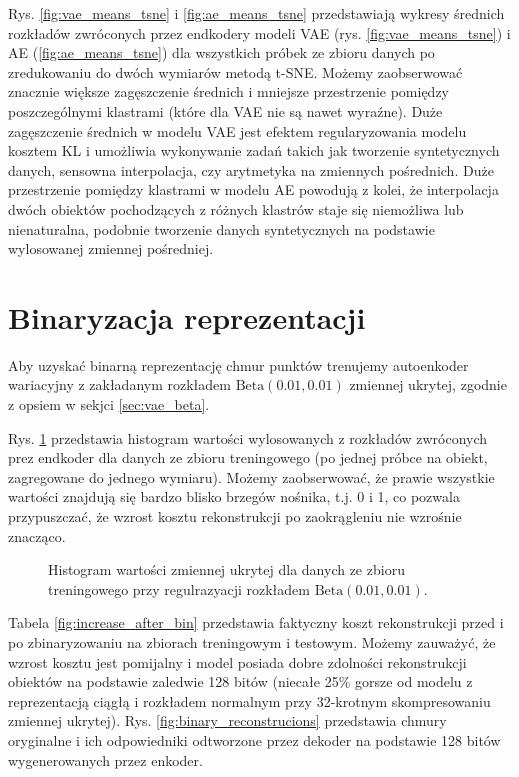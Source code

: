 \documentclass{iithesis}
\begin{document}
Rys. \ref{fig:vae_means_tsne} i \ref{fig:ae_means_tsne} przedstawiają wykresy średnich rozkładów
zwróconych przez endkodery modeli VAE (rys. \ref{fig:vae_means_tsne}) i AE (\ref{fig:ae_means_tsne})
dla wszystkich próbek ze zbioru danych po zredukowaniu do dwóch wymiarów metodą t-SNE.
Możemy zaobserwować znacznie większe zagęszczenie średnich i mniejsze przestrzenie pomiędzy
poszczególnymi klastrami (które dla VAE nie są nawet wyraźne). Duże zagęszczenie średnich
w modelu VAE jest efektem regularyzowania modelu kosztem KL i umożliwia wykonywanie
zadań takich jak tworzenie syntetycznych danych, sensowna interpolacja,
czy arytmetyka na zmiennych pośrednich.
Duże przestrzenie pomiędzy klastrami w modelu AE powodują z kolei, że interpolacja
dwóch obiektów pochodzących z różnych klastrów staje się niemożliwa lub nienaturalna,
podobnie tworzenie danych syntetycznych na podstawie wylosowanej zmiennej pośredniej.

\section{Binaryzacja reprezentacji}
Aby uzyskać binarną reprezentację chmur punktów trenujemy autoenkoder wariacyjny
z zakładanym rozkładem $\text{Beta}(0.01, 0.01)$ zmiennej ukrytej,
zgodnie z opsiem w sekjci \ref{sec:vae_beta}.

Rys. \ref{fig:binary_hist} przedstawia histogram wartości wylosowanych
z rozkładów zwróconych prez endkoder dla danych ze zbioru treningowego
(po jednej próbce na obiekt, zagregowane do jednego wymiaru). Możemy zaobserwować,
że prawie wszystkie wartości znajdują się bardzo blisko brzegów nośnika, t.j. 0 i 1,
co pozwala przypuszczać, że wzrost kosztu rekonstrukcji po zaokrągleniu nie wzrośnie znacząco.

\begin{figure}
    \caption{\label{fig:binary_hist} Histogram wartości zmiennej ukrytej dla danych ze zbioru
    treningowego przy regulrazyacji rozkładem $\text{Beta}(0.01, 0.01)$.}
\end{figure}

Tabela \ref{fig:increase_after_bin} przedstawia faktyczny koszt rekonstrukcji
przed i po zbinaryzowaniu na zbiorach treningowym i testowym. Możemy zauważyć, że wzrost kosztu
jest pomijalny i model posiada dobre zdolności rekonstrukcji obiektów na podstawie zaledwie 128 bitów
(niecałe 25\% gorsze od modelu z reprezentacją ciągłą i rozkładem normalnym przy
32-krotnym skompresowaniu zmiennej ukrytej).
Rys. \ref{fig:binary_reconstrucions} przedstawia chmury oryginalne i ich odpowiedniki
odtworzone przez dekoder na podstawie 128 bitów wygenerowanych przez enkoder.
\end{document}
